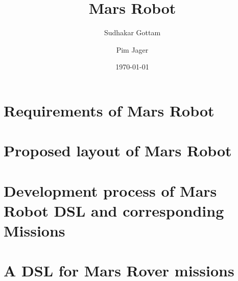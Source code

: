 \documentclass[titlepage]{article}
\author{%
	Sudhakar Gottam\and
	Pim Jager
}
\title{Mars Robot}
\date{\today}
\begin{document}
\maketitle
\tableofcontents
\newpage

\section{Requirements of Mars Robot} \label{sec:requirements}
 

\section{Proposed layout of Mars Robot}


\section{Development process of Mars Robot DSL and corresponding Missions}


\section{A DSL for Mars Rover missions}

\end{document}
